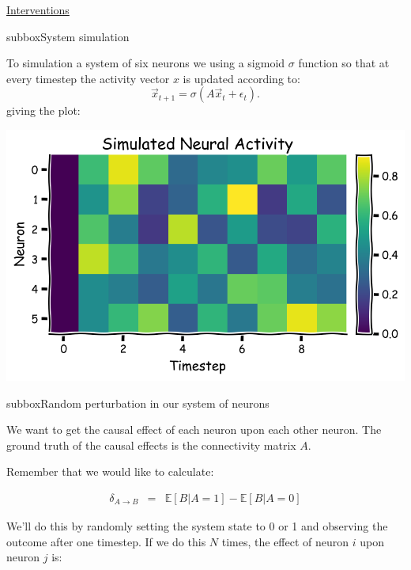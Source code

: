 \begin{textbox}{\href{https://compneuro.neuromatch.io/tutorials/W3D5_NetworkCausality/student/W3D5_Tutorial1.html}{Interventions }   }
\begin{subbox}{subbox}{System simulation}
\scriptsize


To simulation a system of six neurons we using a sigmoid $\sigma$ function so that at every timestep the activity vector $x$ is updated according to: 
\begin{equation*}
\vec{x}_{t+1} = \sigma(A\vec{x}_t + \epsilon_t).
\end{equation*}
giving the plot:

\begin{center}
    
\includegraphics[scale=0.2]{Figures/NC/NC_Figure2.png}
\end{center}
\end{subbox}
\begin{subbox}{subbox}{Random perturbation in our system of neurons}
\scriptsize

We want to get the causal effect of each neuron upon each other neuron. The ground truth of the causal effects is the connectivity matrix $A$.

Remember that we would like to calculate:

\begin{eqnarray*}
\delta_{A\to B} &=& \mathbb{E}[B | A=1] -  \mathbb{E}[B | A=0] 
\end{eqnarray*}


We'll do this by randomly setting the system state to 0 or 1 and observing the outcome after one timestep. If we do this $N$ times, the effect of neuron $i$ upon neuron $j$ is:


\end{subbox}
\end{textbox}

